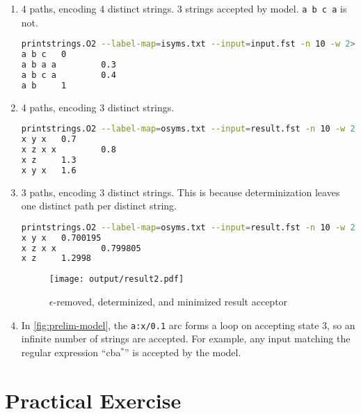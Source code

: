 \documentclass[a4paper,oneside,reqno]{amsart}
\begin{document}
\begin{enumerate}[label=(\roman*)]
  \item 4 paths, encoding 4 distinct strings.  3 strings accepted by model.
    \texttt{a b c a} is not.

    \begin{lstlisting}[language=bash]
printstrings.O2 --label-map=isyms.txt --input=input.fst -n 10 -w 2> /dev/null
a b c   0
a b a a         0.3
a b c a         0.4
a b     1
    \end{lstlisting}

  \item 4 paths, encoding 3 distinct strings.

    \begin{lstlisting}[language=bash]
printstrings.O2 --label-map=osyms.txt --input=result.fst -n 10 -w 2> /dev/null
x y x   0.7
x z x x         0.8
x z     1.3
x y x   1.6
    \end{lstlisting}

  \item 3 paths, encoding 3 distinct strings. This is because determinization leaves
    one distinct path per distinct string.
    \begin{lstlisting}[language=bash]
printstrings.O2 --label-map=osyms.txt --input=result.fst -n 10 -w 2> /dev/null
x y x   0.700195
x z x x         0.799805
x z     1.2998
    \end{lstlisting}
    \begin{figure}[ht!]
      \begin{center}
        \texttt{[image: output/result2.pdf]}
      \end{center}
      \caption{$\epsilon$-removed, determinized, and minimized result acceptor}
    \end{figure}

  \item In \autoref{fig:prelim-model}, the \texttt{a:x/0.1} arc forms a
    loop on accepting state $3$, so an infinite number of strings are accepted.
    For example, any input matching the regular expression ``cba$^*$'' is
    accepted by the model.
\end{enumerate}

\section{Practical Exercise}
\end{document}
